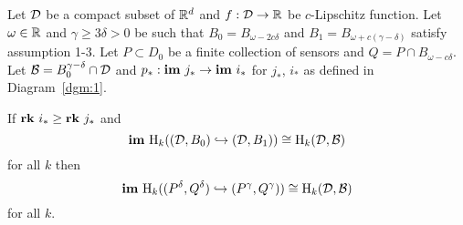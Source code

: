 %
\begin{theorem}\label{thm:tcc}
  Let ${\mathcal{D}}$ be a compact subset of $\mathbb{R}^d$ and $f : {\mathcal{D}}\to\mathbb{R}$ be $c$-Lipschitz function.
  Let $\omega\in\mathbb{R}$ and $\gamma\geq 3\delta > 0$ be such that $B_0 = B_{\omega -2c\delta}$ and $B_1 = B_{\omega + c(\gamma-\delta)}$ satisfy assumption 1-3.
  Let $P\subset D_0$ be a finite collection of sensors and $Q = P\cap B_{\omega - c\delta}$.
  Let ${\mathcal{B}} = B_0^{\gamma-\delta}\cap {\mathcal{D}}$ and $p_* : \mathbf{im}~j_*\to\mathbf{im}~i_*$ for $j_*$, $i_*$ as defined in Diagram~\ref{dgm:1}.

  If $\mathbf{rk}~i_*\geq \mathbf{rk}~j_*$ and
  \[ \mathbf{im}~\mathrm{H}_k(({\mathcal{D}}, B_0)\hookrightarrow ({\mathcal{D}}, B_1))\cong \mathrm{H}_k({\mathcal{D}}, {\mathcal{B}}) \]
  for all $k$ then
  \[ \mathbf{im}~\mathrm{H}_k((P^\delta, Q^\delta)\hookrightarrow (P^\gamma, Q^\gamma))\cong \mathrm{H}_k({\mathcal{D}}, {\mathcal{B}}) \]
  for all $k$.
\end{theorem}
